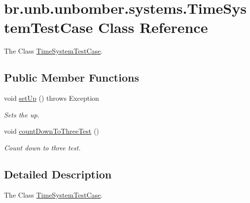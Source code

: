 \hypertarget{classbr_1_1unb_1_1unbomber_1_1systems_1_1_time_system_test_case}{\section{br.\+unb.\+unbomber.\+systems.\+Time\+System\+Test\+Case Class Reference}
\label{classbr_1_1unb_1_1unbomber_1_1systems_1_1_time_system_test_case}
}


The Class \hyperlink{classbr_1_1unb_1_1unbomber_1_1systems_1_1_time_system_test_case}{Time\+System\+Test\+Case}.  


\subsection*{Public Member Functions}
\begin{DoxyCompactItemize}
\item 
void \hyperlink{classbr_1_1unb_1_1unbomber_1_1systems_1_1_time_system_test_case_a79d503c4e2804b112b0f8aa102a43a3a}{set\+Up} ()  throws Exception 
\begin{DoxyCompactList}\small\item\em Sets the up. \end{DoxyCompactList}\item 
void \hyperlink{classbr_1_1unb_1_1unbomber_1_1systems_1_1_time_system_test_case_ad74796448fe76c28b2f0b481679059d4}{count\+Down\+To\+Three\+Test} ()
\begin{DoxyCompactList}\small\item\em Count down to three test. \end{DoxyCompactList}\end{DoxyCompactItemize}


\subsection{Detailed Description}
The Class \hyperlink{classbr_1_1unb_1_1unbomber_1_1systems_1_1_time_system_test_case}{Time\+System\+Test\+Case}. 

